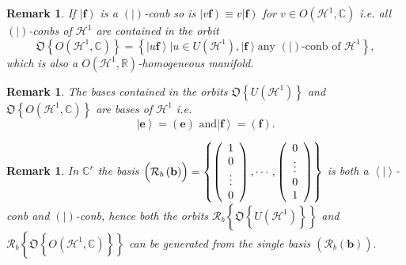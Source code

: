 \documentclass[aps,preprint]{revtex4}%
\newtheorem{remark}[theorem]{Remark}
\begin{document}
\begin{remark}
If $\left\vert \mathbf{f}\right)  $ is a $\left(  \left.  {}\right\vert
\right)  $-conb so is $\left\vert v\mathbf{f}\right)  \equiv v\left\vert
\mathbf{f}\right)  $ for $v\in O\left(  \mathcal{H}^{1},\mathbb{C}\right)  $
i.e. all $\left(  \left.  {}\right\vert \right)  $-conbs of $\mathcal{H}^{1}$
are contained in the orbit
\begin{equation}
\mathfrak{O}\left\{  O\left(  \mathcal{H}^{1},\mathbb{C}\right)  \right\}
=\left\{  \left.  \left\vert u\mathbf{f}\right\rangle \right\vert u\in
U\left(  \mathcal{H}^{1}\right)  ,\left\vert \mathbf{f}\right\rangle \text{
any }\left(  \left.  {}\right\vert \right)  \text{-conb of }\mathcal{H}%
^{1}\right\}  ,
\end{equation}
which is also a $O\left(  \mathcal{H}^{1},\mathbb{R}\right)  $-homogeneous manifold.
\end{remark}

\begin{remark}
The bases contained in the orbits $\mathfrak{O}\left\{  U\left(
\mathcal{H}^{1}\right)  \right\}  $ and $\mathfrak{O}\left\{  O\left(
\mathcal{H}^{1},\mathbb{C}\right)  \right\}  $ are bases of $\mathcal{H}^{1}$
i.e.
\begin{equation}
\left\vert \mathbf{e}\right\rangle =\left(  \mathbf{e}\right)  \text{ and
}\left\vert \mathbf{f}\right\rangle =\left(  \mathbf{f}\right)  .
\end{equation}

\end{remark}

\begin{remark}
In $\mathbb{C}^{r}$ the basis $\left(  \overset{}{\mathcal{R}_{b}\left(
\mathbf{b}\right)  }\right)  =\left\{  \left(
\begin{array}
[c]{c}%
1\\
0\\
\vdots\\
0
\end{array}
\right)  ,\cdots,\left(
\begin{array}
[c]{c}%
0\\
\vdots\\
0\\
1
\end{array}
\right)  \right\}  $ is both a $\left\langle \left.  {}\right\vert
\right\rangle $-conb and $\left(  \left.  {}\right\vert \right)  $-conb, hence
both the orbits $\mathcal{R}_{b}\left\{  \mathfrak{O}\left\{
\overset{}{U\left(  \mathcal{H}^{1}\right)  }\right\}  \right\}  $ and
$\mathcal{R}_{b}\left\{  \mathfrak{O}\left\{  \overset{}{O\left(
\mathcal{H}^{1},\mathbb{C}\right)  }\right\}  \right\}  $ can be generated
from the single basis $\left(  \overset{}{\mathcal{R}_{b}\left(
\mathbf{b}\right)  }\right)  .$
\end{remark}
\end{document}
